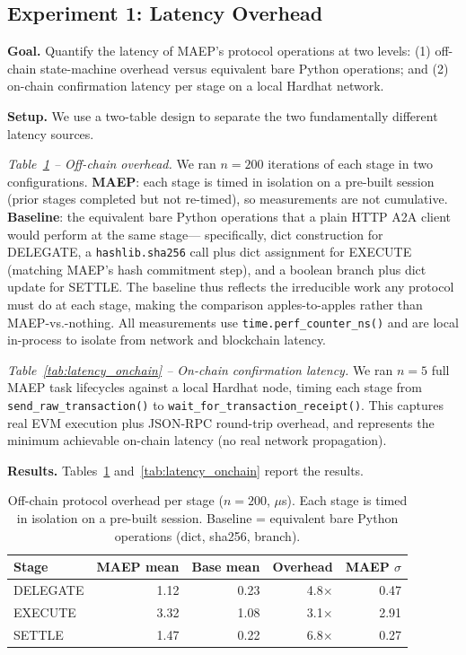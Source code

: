 \documentclass[conference]{IEEEtran}
\begin{document}
\subsection{Experiment 1: Latency Overhead}

\textbf{Goal.}
Quantify the latency of MAEP's protocol operations at two levels:
(1) off-chain state-machine overhead versus equivalent bare Python
operations; and (2) on-chain confirmation latency per stage on a
local Hardhat network.

\textbf{Setup.}
We use a two-table design to separate the two fundamentally different
latency sources.

\emph{Table~\ref{tab:latency_offchain} -- Off-chain overhead.}
We ran $n=200$ iterations of each stage in two configurations.
\textbf{MAEP}: each stage is timed in isolation on a pre-built session
(prior stages completed but not re-timed), so measurements are not
cumulative.  \textbf{Baseline}: the equivalent bare Python operations
that a plain HTTP A2A client would perform at the same stage---
specifically, dict construction for DELEGATE, a \texttt{hashlib.sha256}
call plus dict assignment for EXECUTE (matching MAEP's hash
commitment step), and a boolean branch plus dict update for SETTLE.
The baseline thus reflects the irreducible work any protocol must do at
each stage, making the comparison apples-to-apples rather than
MAEP-vs.-nothing.  All measurements use \texttt{time.perf\_counter\_ns()}
and are local in-process to isolate from network and blockchain latency.

\emph{Table~\ref{tab:latency_onchain} -- On-chain confirmation latency.}
We ran $n=5$ full MAEP task lifecycles against a local Hardhat node,
timing each stage from \texttt{send\_raw\_transaction()} to
\texttt{wait\_for\_transaction\_receipt()}.  This captures real EVM
execution plus JSON-RPC round-trip overhead, and represents the minimum
achievable on-chain latency (no real network propagation).

\textbf{Results.}
Tables~\ref{tab:latency_offchain} and~\ref{tab:latency_onchain} report
the results.

\begin{table}[h]
\caption{Off-chain protocol overhead per stage ($n=200$, $\mu$s).
         Each stage is timed in isolation on a pre-built session.
         Baseline = equivalent bare Python operations (dict, sha256, branch).}
\label{tab:latency_offchain}
\centering
\begin{tabular}{lrrrr}
\toprule
\textbf{Stage} & \textbf{MAEP mean} & \textbf{Base mean} & \textbf{Overhead} & \textbf{MAEP $\sigma$} \\
\midrule
DELEGATE & 1.12 & 0.23 & 4.8$\times$ & 0.47 \\
EXECUTE  & 3.32 & 1.08 & 3.1$\times$ & 2.91 \\
SETTLE   & 1.47 & 0.22 & 6.8$\times$ & 0.27 \\
\bottomrule
\end{tabular}
\end{table}
\end{document}

